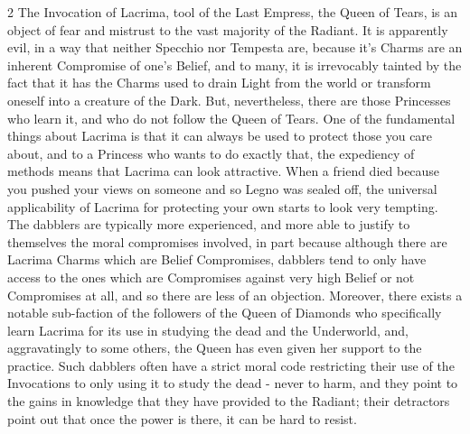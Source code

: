\begin{multicols}{2}
The Invocation of Lacrima, tool of the Last Empress, the Queen of Tears, is an object of fear and mistrust to the vast majority of the Radiant. It is apparently evil, in a way that neither Specchio nor Tempesta are, because it's Charms are an inherent Compromise of one's Belief, and to many, it is irrevocably tainted by the fact that it has the Charms used to drain Light from the world or transform oneself into a creature of the Dark. But, nevertheless, there are those Princesses who learn it, and who do not follow the Queen of Tears. One of the fundamental things about Lacrima is that it can always be used to protect those you care about, and to a Princess who wants to do exactly that, the expediency of methods means that Lacrima can look attractive. When a friend died because you pushed your views on someone and so Legno was sealed off, the universal applicability of Lacrima for protecting your own starts to look very tempting. The dabblers are typically more experienced, and more able to justify to 
themselves the 
moral compromises involved, in part because although there are Lacrima Charms which are Belief Compromises, dabblers tend to only have access to the ones which are Compromises against very high Belief or not Compromises at all, and so there are less of an objection. Moreover, there exists a notable sub-faction of the followers of the Queen of Diamonds who specifically learn Lacrima for its use in studying the dead and the Underworld, and, aggravatingly to some others, the Queen has even given her support to the practice. Such dabblers often have a strict moral code restricting their use of the Invocations to only using it to study the dead - never to harm, and they point to the gains in knowledge that they have provided to the Radiant; their detractors point out that once the power is there, it can be hard to resist. 


\end{multicols}
